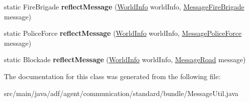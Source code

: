 \begin{DoxyCompactItemize}
static Fire\+Brigade {\bfseries reflect\+Message} (\hyperlink{classadf_1_1agent_1_1info_1_1WorldInfo}{World\+Info} world\+Info, \hyperlink{classadf_1_1agent_1_1communication_1_1standard_1_1bundle_1_1information_1_1MessageFireBrigade}{Message\+Fire\+Brigade} message)
\item 
\hypertarget{classadf_1_1agent_1_1communication_1_1standard_1_1bundle_1_1MessageUtil_a8e0ffb2481d2edaa6388f4d279f4db44}{}\label{classadf_1_1agent_1_1communication_1_1standard_1_1bundle_1_1MessageUtil_a8e0ffb2481d2edaa6388f4d279f4db44} 
static Police\+Force {\bfseries reflect\+Message} (\hyperlink{classadf_1_1agent_1_1info_1_1WorldInfo}{World\+Info} world\+Info, \hyperlink{classadf_1_1agent_1_1communication_1_1standard_1_1bundle_1_1information_1_1MessagePoliceForce}{Message\+Police\+Force} message)
\item 
\hypertarget{classadf_1_1agent_1_1communication_1_1standard_1_1bundle_1_1MessageUtil_af20c0c32fa83c965a4cc7158ef952fd8}{}\label{classadf_1_1agent_1_1communication_1_1standard_1_1bundle_1_1MessageUtil_af20c0c32fa83c965a4cc7158ef952fd8} 
static Blockade {\bfseries reflect\+Message} (\hyperlink{classadf_1_1agent_1_1info_1_1WorldInfo}{World\+Info} world\+Info, \hyperlink{classadf_1_1agent_1_1communication_1_1standard_1_1bundle_1_1information_1_1MessageRoad}{Message\+Road} message)
\end{DoxyCompactItemize}


The documentation for this class was generated from the following file\+:\begin{DoxyCompactItemize}
\item 
src/main/java/adf/agent/communication/standard/bundle/Message\+Util.\+java\end{DoxyCompactItemize}
